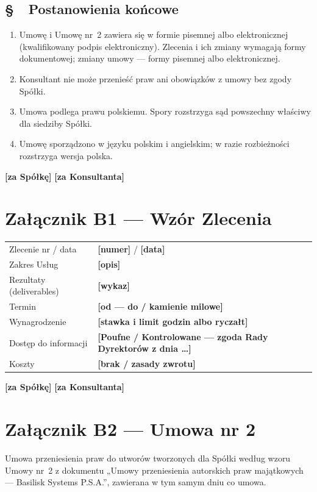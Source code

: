 \documentclass[11pt,a4paper]{report}
\newcounter{paragraf}
\newcommand{\paragraf}[1]{%
  \refstepcounter{paragraf}%
  \Needspace{5\baselineskip}%
  \subsection*{\S~\theparagraf\ #1}%
}
\newenvironment{ContractClause}[1]{\paragraf{#1}}{\par}
\newcommand{\field}[1]{\textbf{[#1]}}
\begin{document}
\begin{ContractClause}{Postanowienia końcowe}
\begin{enumerate}
  \item Umowę i Umowę nr~2 zawiera się w formie pisemnej albo elektronicznej (kwalifikowany podpis elektroniczny). Zlecenia i ich zmiany wymagają formy dokumentowej; zmiany umowy --- formy pisemnej albo elektronicznej.
  \item Konsultant nie może przenieść praw ani obowiązków z umowy bez zgody Spółki.
  \item Umowa podlega prawu polskiemu. Spory rozstrzyga sąd powszechny właściwy dla siedziby Spółki.
  \item Umowę sporządzono w języku polskim i angielskim; w razie rozbieżności rozstrzyga wersja polska.
\end{enumerate}
\end{ContractClause}

\vspace{1em}
\field{za Spółkę} \hfill \field{za Konsultanta}

\section*{Załącznik B1 --- Wzór Zlecenia}
\begin{center}
\begin{tabularx}{\linewidth}{@{}p{4.2cm} X@{}}
\toprule
Zlecenie nr / data & \field{numer} / \field{data} \\
Zakres Usług & \field{opis} \\
Rezultaty (deliverables) & \field{wykaz} \\
Termin & \field{od --- do / kamienie milowe} \\
Wynagrodzenie & \field{stawka i limit godzin albo ryczałt} \\
Dostęp do informacji & \field{Poufne / Kontrolowane --- zgoda Rady Dyrektorów z dnia \ldots} \\
Koszty & \field{brak / zasady zwrotu} \\
\bottomrule
\end{tabularx}
\end{center}
\field{za Spółkę} \hfill \field{za Konsultanta}

\section*{Załącznik B2 --- Umowa nr 2}
Umowa przeniesienia praw do utworów tworzonych dla Spółki według wzoru Umowy nr~2 z dokumentu „Umowy przeniesienia autorskich praw majątkowych --- Basilisk Systems P.S.A.”, zawierana w tym samym dniu co umowa.
\end{document}
